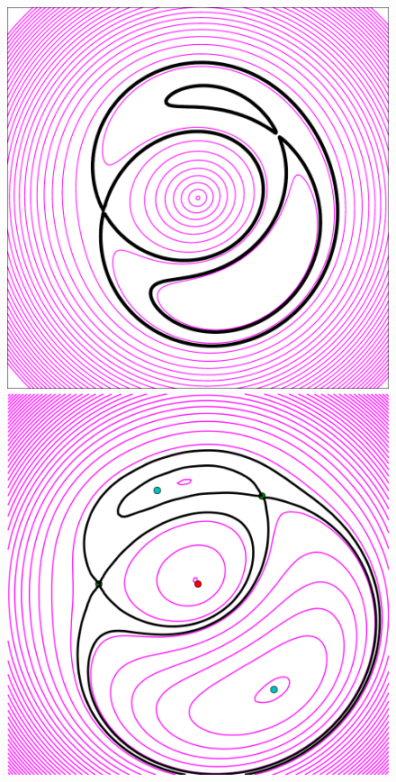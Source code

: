\begin{figure}
  \includegraphics[width=\myplotswidth]{fig/ASW0002z6f_006919_arriv}
  \includegraphics[width=\myplotswidth]{fig/006919_spaghetti} \\

\end{figure}
